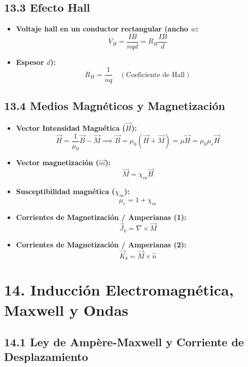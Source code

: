 \documentclass[11pt,a4paper]{article}
\begin{document}
\subsection*{13.3 Efecto Hall}

\begin{itemize}
  \item \textbf{Voltaje hall en un conductor rectangular (ancho $w$:}
  \[
    V_H = \frac{I B}{n q d} = R_H \frac{I B}{d}
  \]
  \item \textbf{Espesor $d$):}
  \[
    R_H = \frac{1}{n q} \quad (\text{Coeficiente de Hall})
  \]
\end{itemize}

\subsection*{13.4 Medios Magnéticos y Magnetización}

\begin{itemize}
  \item \textbf{Vector Intensidad Magnética ($\vec{H}$):}
  \[
    \vec{H} = \frac{1}{\mu_0}\vec{B} - \vec{M} \implies \vec{B} = \mu_0 (\vec{H} + \vec{M}) = \mu \vec{H} = \mu_0 \mu_r \vec{H}
  \]
  \item \textbf{Vector magnetización ($\vec{m}$):}
  \[
    \vec{M} = \chi_m \vec{H}
  \]
  \item \textbf{Susceptibilidad magnética ($\chi_m$):}
  \[
    \mu_r = 1 + \chi_m
  \]
  \item \textbf{Corrientes de Magnetización / Amperianas (1):}
  \[
    \vec{J}_b = \nabla \times \vec{M}
  \]
  \item \textbf{Corrientes de Magnetización / Amperianas (2):}
  \[
    \vec{K}_b = \vec{M} \times \hat{n}
  \]
\end{itemize}

\section*{14. Inducción Electromagnética, Maxwell y Ondas}

\subsection*{14.1 Ley de Ampère-Maxwell y Corriente de Desplazamiento}
\end{document}
